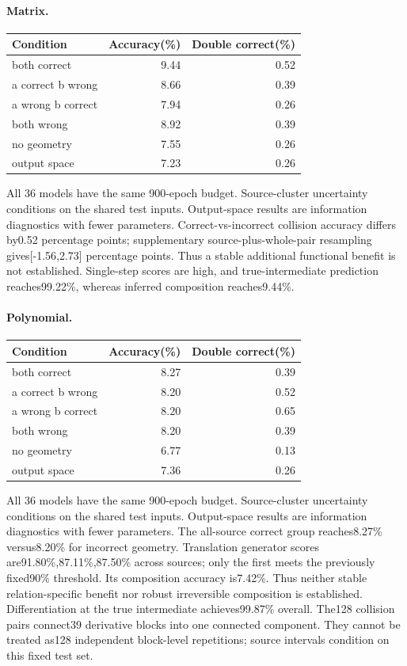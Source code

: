 \paragraph{Matrix.}
\begin{center}\begin{tabular}{lrr}\toprule Condition & Accuracy(\%) & Double correct(\%)\\\midrule
both correct & 9.44 & 0.52\\
a correct b wrong & 8.66 & 0.39\\
a wrong b correct & 7.94 & 0.26\\
both wrong & 8.92 & 0.39\\
no geometry & 7.55 & 0.26\\
output space & 7.23 & 0.26\\
\bottomrule\end{tabular}\end{center}
All 36 models have the same 900-epoch budget. Source-cluster uncertainty conditions on the shared test inputs. Output-space results are information diagnostics with fewer parameters.
Correct-vs-incorrect collision accuracy differs by0.52 percentage points; supplementary source-plus-whole-pair resampling gives[-1.56,2.73] percentage points. Thus a stable additional functional benefit is not established. Single-step scores are high, and true-intermediate prediction reaches99.22\%, whereas inferred composition reaches9.44\%.
\paragraph{Polynomial.}
\begin{center}\begin{tabular}{lrr}\toprule Condition & Accuracy(\%) & Double correct(\%)\\\midrule
both correct & 8.27 & 0.39\\
a correct b wrong & 8.20 & 0.52\\
a wrong b correct & 8.20 & 0.65\\
both wrong & 8.20 & 0.39\\
no geometry & 6.77 & 0.13\\
output space & 7.36 & 0.26\\
\bottomrule\end{tabular}\end{center}
All 36 models have the same 900-epoch budget. Source-cluster uncertainty conditions on the shared test inputs. Output-space results are information diagnostics with fewer parameters.
The all-source correct group reaches8.27\% versus8.20\% for incorrect geometry. Translation generator scores are91.80\%,87.11\%,87.50\% across sources; only the first meets the previously fixed90\% threshold. Its composition accuracy is7.42\%. Thus neither stable relation-specific benefit nor robust irreversible composition is established. Differentiation at the true intermediate achieves99.87\% overall.
The128 collision pairs connect39 derivative blocks into one connected component. They cannot be treated as128 independent block-level repetitions; source intervals condition on this fixed test set.
